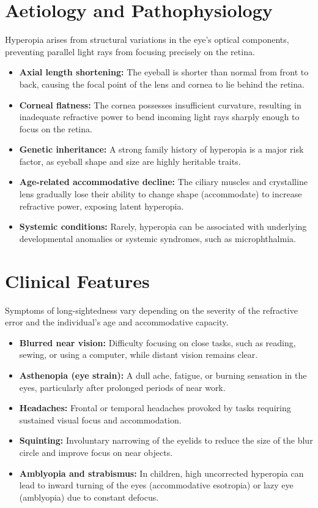 \section*{Aetiology and Pathophysiology}
Hyperopia arises from structural variations in the eye's optical components, preventing parallel light rays from focusing precisely on the retina.
\begin{itemize}
    \item \textbf{Axial length shortening:} The eyeball is shorter than normal from front to back, causing the focal point of the lens and cornea to lie behind the retina.
    \item \textbf{Corneal flatness:} The cornea possesses insufficient curvature, resulting in inadequate refractive power to bend incoming light rays sharply enough to focus on the retina.
    \item \textbf{Genetic inheritance:} A strong family history of hyperopia is a major risk factor, as eyeball shape and size are highly heritable traits.
    \item \textbf{Age-related accommodative decline:} The ciliary muscles and crystalline lens gradually lose their ability to change shape (accommodate) to increase refractive power, exposing latent hyperopia.
    \item \textbf{Systemic conditions:} Rarely, hyperopia can be associated with underlying developmental anomalies or systemic syndromes, such as microphthalmia.
\end{itemize}

\section*{Clinical Features}
Symptoms of long-sightedness vary depending on the severity of the refractive error and the individual's age and accommodative capacity.
\begin{itemize}
    \item \textbf{Blurred near vision:} Difficulty focusing on close tasks, such as reading, sewing, or using a computer, while distant vision remains clear.
    \item \textbf{Asthenopia (eye strain):} A dull ache, fatigue, or burning sensation in the eyes, particularly after prolonged periods of near work.
    \item \textbf{Headaches:} Frontal or temporal headaches provoked by tasks requiring sustained visual focus and accommodation.
    \item \textbf{Squinting:} Involuntary narrowing of the eyelids to reduce the size of the blur circle and improve focus on near objects.
    \item \textbf{Amblyopia and strabismus:} In children, high uncorrected hyperopia can lead to inward turning of the eyes (accommodative esotropia) or lazy eye (amblyopia) due to constant defocus.
\end{itemize}

